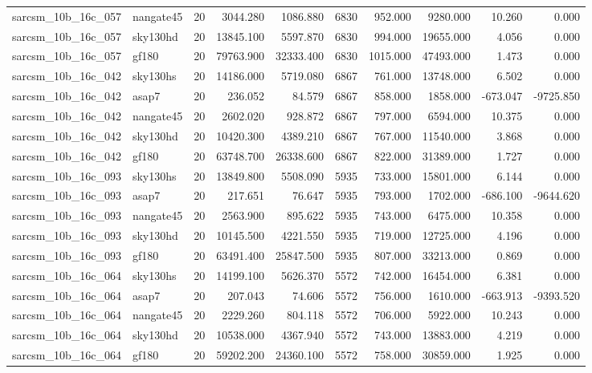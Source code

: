 \documentclass{article}
\begin{document}
\begin{longtable}{llrrrrrrrr}
sarcsm\_10b\_16c\_057 & nangate45 & 20 & 3044.280 & 1086.880 & 6830 & 952.000 & 9280.000 & 10.260 & 0.000 \\
sarcsm\_10b\_16c\_057 & sky130hd & 20 & 13845.100 & 5597.870 & 6830 & 994.000 & 19655.000 & 4.056 & 0.000 \\
sarcsm\_10b\_16c\_057 & gf180 & 20 & 79763.900 & 32333.400 & 6830 & 1015.000 & 47493.000 & 1.473 & 0.000 \\
sarcsm\_10b\_16c\_042 & sky130hs & 20 & 14186.000 & 5719.080 & 6867 & 761.000 & 13748.000 & 6.502 & 0.000 \\
sarcsm\_10b\_16c\_042 & asap7 & 20 & 236.052 & 84.579 & 6867 & 858.000 & 1858.000 & -673.047 & -9725.850 \\
sarcsm\_10b\_16c\_042 & nangate45 & 20 & 2602.020 & 928.872 & 6867 & 797.000 & 6594.000 & 10.375 & 0.000 \\
sarcsm\_10b\_16c\_042 & sky130hd & 20 & 10420.300 & 4389.210 & 6867 & 767.000 & 11540.000 & 3.868 & 0.000 \\
sarcsm\_10b\_16c\_042 & gf180 & 20 & 63748.700 & 26338.600 & 6867 & 822.000 & 31389.000 & 1.727 & 0.000 \\
sarcsm\_10b\_16c\_093 & sky130hs & 20 & 13849.800 & 5508.090 & 5935 & 733.000 & 15801.000 & 6.144 & 0.000 \\
sarcsm\_10b\_16c\_093 & asap7 & 20 & 217.651 & 76.647 & 5935 & 793.000 & 1702.000 & -686.100 & -9644.620 \\
sarcsm\_10b\_16c\_093 & nangate45 & 20 & 2563.900 & 895.622 & 5935 & 743.000 & 6475.000 & 10.358 & 0.000 \\
sarcsm\_10b\_16c\_093 & sky130hd & 20 & 10145.500 & 4221.550 & 5935 & 719.000 & 12725.000 & 4.196 & 0.000 \\
sarcsm\_10b\_16c\_093 & gf180 & 20 & 63491.400 & 25847.500 & 5935 & 807.000 & 33213.000 & 0.869 & 0.000 \\
sarcsm\_10b\_16c\_064 & sky130hs & 20 & 14199.100 & 5626.370 & 5572 & 742.000 & 16454.000 & 6.381 & 0.000 \\
sarcsm\_10b\_16c\_064 & asap7 & 20 & 207.043 & 74.606 & 5572 & 756.000 & 1610.000 & -663.913 & -9393.520 \\
sarcsm\_10b\_16c\_064 & nangate45 & 20 & 2229.260 & 804.118 & 5572 & 706.000 & 5922.000 & 10.243 & 0.000 \\
sarcsm\_10b\_16c\_064 & sky130hd & 20 & 10538.000 & 4367.940 & 5572 & 743.000 & 13883.000 & 4.219 & 0.000 \\
sarcsm\_10b\_16c\_064 & gf180 & 20 & 59202.200 & 24360.100 & 5572 & 758.000 & 30859.000 & 1.925 & 0.000 \\

\end{longtable}
\end{document}
